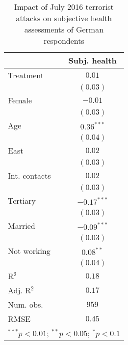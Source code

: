 
\begin{table}
\caption{Impact of July 2016 terrorist attacks on subjective health assessments of German respondents}
\begin{center}
\begin{tabular}{l c}
\toprule
 & Subj. health \\
\midrule
Treatment     & $0.01$        \\
              & $(0.03)$      \\
Female        & $-0.01$       \\
              & $(0.03)$      \\
Age           & $0.36^{***}$  \\
              & $(0.04)$      \\
East          & $0.02$        \\
              & $(0.03)$      \\
Int. contacts & $0.02$        \\
              & $(0.03)$      \\
Tertiary      & $-0.17^{***}$ \\
              & $(0.03)$      \\
Married       & $-0.09^{***}$ \\
              & $(0.03)$      \\
Not working   & $0.08^{**}$   \\
              & $(0.04)$      \\
\midrule
R$^2$         & $0.18$        \\
Adj. R$^2$    & $0.17$        \\
Num. obs.     & $959$         \\
RMSE          & $0.45$        \\
\bottomrule
\multicolumn{2}{l}{\scriptsize{$^{***}p<0.01$; $^{**}p<0.05$; $^{*}p<0.1$}}
\end{tabular}
\label{tab_health}
\end{center}
\end{table}
